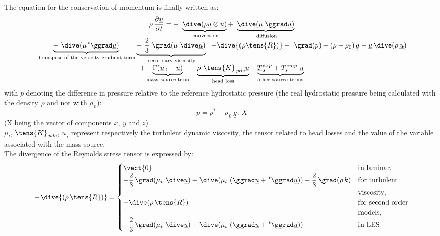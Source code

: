 The equation for the conservation of momentum is finally written as:
\begin{equation}
\begin{array}{lcl}
&\displaystyle \rho\,
\frac{\partial \underline {u} } {\partial t} = -\
\underbrace {\dive(\rho \underline{u} \otimes \underline{u})}_{\text{
convection}} +\ \underbrace {\dive (\mu\ \ggrad \underline {u})}_{\text{
diffusion}} &\\
&\displaystyle \underbrace { +\ \dive (\mu \,^t\ggrad \underline {u}) }_{\text{
transpose of the velocity gradient term}}
\underbrace { - \ \frac {2} {3}\ \grad (\mu\ \dive \underline {u})}_{\text{
secondary viscosity}}\ \ - \dive{(\rho \tens{R})}
 -\ \grad(p) + (\rho -\rho_0)\,\underline {g} +
\underline{u}\,\dive (\rho\,\underline {u})&\\
&\displaystyle +\underbrace {\Gamma
(\underline{u}_{\,i}-\underline{u})}_{\text{mass source term}}-
\underbrace {\rho\
\tens{K}_{\,pdc} \underline {u}}_{\text{head loss}} +
\underbrace { \underline{T}_{\,s}^{\,exp}+
T_{s}^{\,imp}\ \underline{u}}_{\text{other source terms}}
\label{Base_Predvv_eqqdm}

\end{array}
\end{equation}
with $p$ denoting the difference in pressure relative to the reference hydrostatic
pressure (the real hydrostatic pressure being calculated with the density
$\rho$ and not with $\rho_{\,0}$):
\begin{equation}
p=p^*-\rho_{\,0}\ \underline{g}\,.\,\underline{X}
\end{equation}
(\underline{X} being the vector of components $x$, $y$ and $z$).\\
$\mu_t$, $\tens{K}_{\,pdc}$, $\underline{u}_{\,i}$ represent respectively
the turbulent dynamic viscosity, the tensor related to head losses and the value of the
variable associated with the mass source.\\
The divergence of the Reynolds stress tensor is expressed by:
\begin{equation}
-\dive{(\rho\,\tens{R})}=
\begin{cases}
\vect{0} & \text{in laminar}, \\
 -\displaystyle\frac {2} {3}\, \grad (\mu_t\ \dive \underline {u})+\dive (\mu_t\ (\ggrad \underline {u}+ \,^t\ggrad \underline {u}))-\frac {2}{3}\,\grad (\rho\, k) & \text{for turbulent}\\
 & \text{viscosity}, \\
 -\dive(\rho\,\tens{R})& \text{for second-order}\\
 & \text{models},\\
-\displaystyle\frac {2} {3}\, \grad (\mu_t\ \dive \underline {u})+\dive (\mu_t\ (\ggrad \underline {u}+ \,^t\ggrad \underline {u})) & \text{in  LES}\\
\end{cases}
\end{equation}

